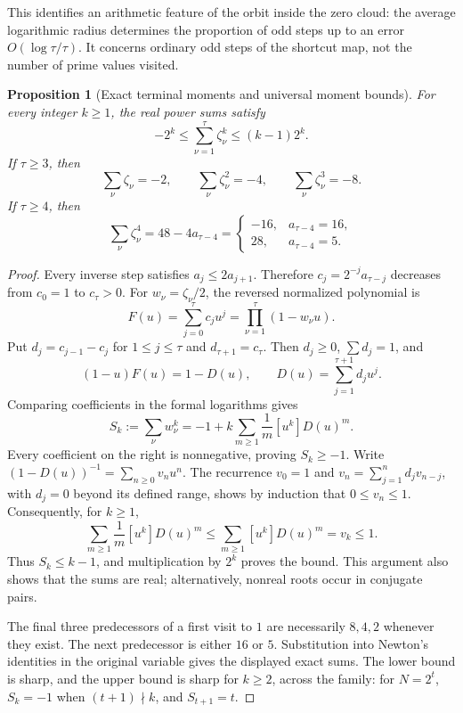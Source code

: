 \documentclass[11pt,a4paper]{article}
\newtheorem{proposition}[theorem]{Proposition}
\theoremstyle{definition}
\theoremstyle{remark}
\numberwithin{equation}{section}
\begin{document}
This identifies an arithmetic feature of the orbit inside the zero cloud:
the average logarithmic radius determines the proportion of odd steps up
to an error $O(\log\tau/\tau)$. It concerns ordinary odd steps of the
shortcut map, not the number of prime values visited.

\begin{proposition}[Exact terminal moments and universal moment bounds]
\label{C:prop:zd-moments}
For every integer $k\ge1$, the real power sums satisfy
\[
 -2^k\le\sum_{\nu=1}^{\tau}\zeta_\nu^k\le(k-1)2^k.
\]
If $\tau\ge3$, then
\[
 \sum_\nu\zeta_\nu=-2,\qquad
 \sum_\nu\zeta_\nu^2=-4,\qquad
 \sum_\nu\zeta_\nu^3=-8.
\]
If $\tau\ge4$, then
\[
 \sum_\nu\zeta_\nu^4
 =48-4a_{\tau-4}
 =\begin{cases}-16,&a_{\tau-4}=16,\\28,&a_{\tau-4}=5.
 \end{cases}
\]
\end{proposition}
\begin{proof}
Every inverse step satisfies $a_j\le2a_{j+1}$. Therefore
$c_j=2^{-j}a_{\tau-j}$ decreases from $c_0=1$ to $c_\tau>0$.
For $w_\nu=\zeta_\nu/2$, the reversed normalized polynomial is
\[
 F(u)=\sum_{j=0}^{\tau}c_ju^j
     =\prod_{\nu=1}^{\tau}(1-w_\nu u).
\]
Put $d_j=c_{j-1}-c_j$ for $1\le j\le\tau$ and
$d_{\tau+1}=c_\tau$. Then $d_j\ge0$, $\sum d_j=1$, and
\[
 (1-u)F(u)=1-D(u),\qquad D(u)=\sum_{j=1}^{\tau+1}d_ju^j.
\]
Comparing coefficients in the formal logarithms gives
\[
 S_k:=\sum_\nu w_\nu^k
 =-1+k\sum_{m\ge1}\frac1m[u^k]D(u)^m.
\]
Every coefficient on the right is nonnegative, proving $S_k\ge-1$.
Write $(1-D(u))^{-1}=\sum_{n\ge0}v_nu^n$. The recurrence
$v_0=1$ and $v_n=\sum_{j=1}^{n}d_jv_{n-j}$, with $d_j=0$
beyond its defined range, shows by induction that $0\le v_n\le1$.
Consequently, for $k\ge1$,
\[
 \sum_{m\ge1}\frac1m[u^k]D(u)^m
 \le\sum_{m\ge1}[u^k]D(u)^m=v_k\le1.
\]
Thus $S_k\le k-1$, and multiplication by $2^k$ proves the bound.
This argument also shows that the sums are real; alternatively,
nonreal roots occur in conjugate pairs.

The final three predecessors of a first visit to $1$ are necessarily
$8,4,2$ whenever they exist. The next predecessor is either $16$ or
$5$. Substitution into Newton's identities in the original variable
gives the displayed exact sums. The lower bound is sharp, and the upper bound is sharp for $k\ge2$, across
the family: for $N=2^t$, $S_k=-1$ when $(t+1)\nmid k$, and
$S_{t+1}=t$.
\end{proof}
\end{document}
